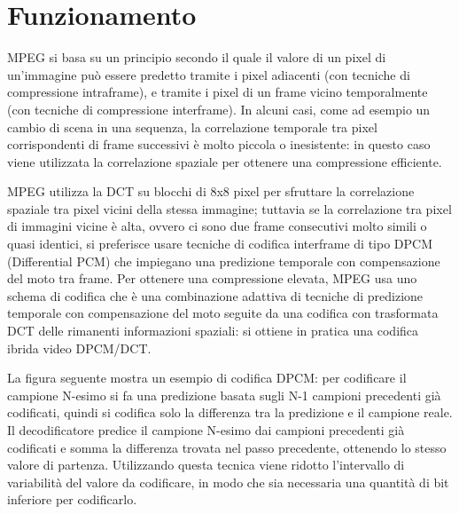 \section{Funzionamento}
MPEG si basa su un principio secondo il quale il valore di un pixel di un'immagine può essere predetto tramite i pixel adiacenti (con tecniche di compressione intraframe), e tramite i pixel di un frame vicino temporalmente (con tecniche di compressione interframe). In alcuni casi, come ad esempio un cambio di scena in una sequenza, la correlazione temporale tra pixel corrispondenti di frame successivi è molto piccola o inesistente: in questo caso viene utilizzata la correlazione spaziale per ottenere una compressione efficiente.

MPEG utilizza la DCT su blocchi di 8x8 pixel per sfruttare la correlazione spaziale tra pixel vicini della stessa immagine; tuttavia se la correlazione tra pixel di immagini vicine è alta, ovvero ci sono due frame consecutivi molto simili o quasi identici, si preferisce usare tecniche di codifica interframe di tipo DPCM (Differential PCM) che impiegano una predizione temporale con compensazione del moto tra frame. Per ottenere una compressione elevata, MPEG usa uno schema di codifica che è una combinazione adattiva di tecniche di predizione temporale con compensazione del moto seguite da una codifica con trasformata DCT delle rimanenti informazioni spaziali: si ottiene in pratica una codifica ibrida video DPCM/DCT.

\vspace{5mm}

La figura seguente mostra un esempio di codifica DPCM: per codificare il campione N-esimo si fa una predizione basata sugli N-1 campioni precedenti già codificati, quindi si codifica solo la differenza tra la predizione e il campione reale. Il decodificatore predice il campione N-esimo dai campioni precedenti già codificati e somma la differenza trovata nel passo precedente, ottenendo lo stesso valore di partenza. Utilizzando questa tecnica viene ridotto l'intervallo di variabilità del valore da codificare, in modo che sia necessaria una quantità di bit inferiore per codificarlo.

\begin{figure}[htbp!]
  \centering
  
\end{figure}
\FloatBarrier

